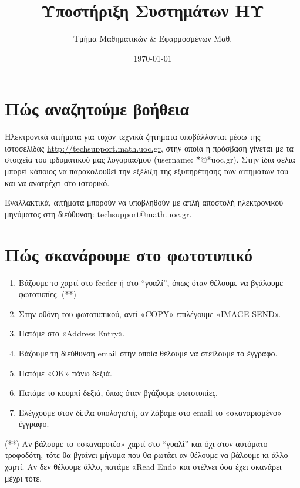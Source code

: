 \documentclass[a4paper,11pt,greek]{article}
\title{Υποστήριξη Συστημάτων ΗΥ}
\date{\today}
\author{Τμήμα Μαθηματικών \& Εφαρμοσμένων Μαθ.}
\begin{document}
\maketitle
\tableofcontents
\pagebreak
{}\label{index::doc}

\section{Πώς αναζητούμε βοήθεια }

Ηλεκτρονικά αιτήματα για τυχόν τεχνικά ζητήματα υποβάλλονται
μέσω της ιστοσελίδας \url{http://techsupport.math.uoc.gr}, στην οποία
η πρόσβαση γίνεται με τα στοιχεία του ιρδυματικού μας λογαριασμού
(username: {\color{red}\bfseries{}*}@*uoc.gr). Στην ίδια σελια μπορεί κάποιος
να παρακολουθεί την εξέλιξη της εξυπηρέτησης των αιτημάτων του
και να ανατρέχει στο ιστορικό.

Εναλλακτικά, αιτήματα μπορούν να υποβληθούν με απλή αποστολή ηλεκτρονικού
μηνύματος στη διεύθυνση: \href{mailto:techsupport@math.uoc.gr}{techsupport@math.uoc.gr}.


\section{Πώς σκανάρουμε στο φωτοτυπικό}
\label{HowToScan::doc}\label{HowToScan:id1}\begin{enumerate}
\item {} 
Βάζουμε το χαρτί στο feeder ή στο ``γυαλί'', όπως όταν θέλουμε να βγάλουμε φωτοτυπίες. (**)

\item {} 
Στην οθόνη του φωτοτυπικού, αντί «COPY» επιλέγουμε «IMAGE SEND».

\item {} 
Πατάμε στο «Address Entry».

\item {} 
Βάζουμε τη διεύθυνση email στην οποία θέλουμε να στείλουμε το έγγραφο.

\item {} 
Πατάμε «OK» πάνω δεξιά.

\item {} 
Πατάμε το κουμπί δεξιά, όπως όταν βγάζουμε φωτοτυπίες.

\item {} 
Ελέγχουμε στον δίπλα υπολογιστή, αν λάβαμε στο email το «σκαναρισμένο» έγγραφο.

\end{enumerate}

(**) Αν βάλουμε το «σκαναροτέο» χαρτί στο ``γυαλί'' και όχι στον αυτόματο
τροφοδότη, τότε θα βγαίνει μήνυμα που θα ρωτάει αν θέλουμε να βάλουμε κι
άλλο χαρτί. Αν δεν θέλουμε άλλο, πατάμε «Read End» και στέλνει όσα έχει
σκανάρει μέχρι τότε.
\end{document}
